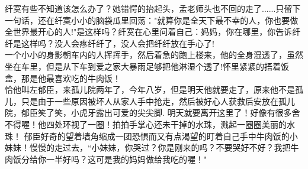 \documentclass[a4paper]{article}
\begin{document}
\begin{multicols}{2}
纤寞有些不知道该怎么办了？她错愕的抬起头，孟老师头也不回的走了......只留下一句话，还在纤寞小小的脑袋瓜里回荡："就算你是全天下最不幸的人，你也要做全世界最开心的人!"是这样吗？纤寞在心里问着自己：妈妈，你在哪里，你告诉纤纤是这样吗？没人会疼纤纤了，没人会把纤纤放在手心了!\\
一个小小的身影朝车内的人挥挥手，然后着急的跑上楼来，他的全身湿透了，虽然坐在车里，但是从下车到爱之家大暴雨足够把他淋湿个透了!怀里紧紧的捂着饭盒，那是他最喜欢吃的牛肉饭！\\
恰他叫左郁臣，来孤儿院两年了，今年八岁，但是明天他就要走了，原来他不是孤儿，只是由于一些原因被坏人从家人手中抢走，然后被好心人获救后安放在孤儿院，郁臣笑了笑，小虎牙露出可爱的尖尖脚.
明天就要离开这里了！好像有很多舍不得喔！他四处环视了一圈！拍拍手掌心还未干掉的水珠，溅起一圈圈美丽的水珠！
郁臣好奇的望着墙角缩成一团恐惧而又有点渴望的盯着自己手中牛肉饭的小妹妹！慢慢的走过去，``小妹妹，你哭过？你是刚来的吗？不要哭好不好？我把牛肉饭分给你一半好吗？这可是我的妈妈做给我吃的喔！"
\end{multicols}
\end{document}
